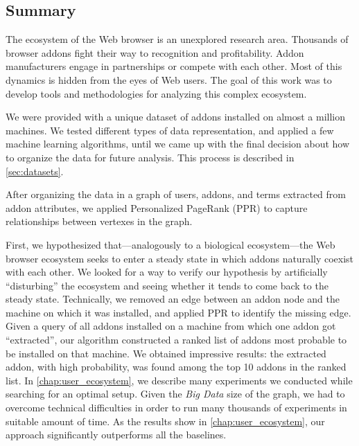 \documentclass[ijoc,nonblindrev]{informs3} %
\numberwithin{equation}{subsection}
\begin{document}
\subsection{Summary}
\label{chap:summary}

The ecosystem of the Web browser is an unexplored research area. Thousands of browser addons fight their way to recognition and profitability. Addon manufacturers engage in partnerships or compete with each other. Most of this dynamics is hidden from the eyes of Web users. The goal of this work was to develop tools and methodologies for analyzing this complex ecosystem.

We were provided with a unique dataset of addons installed on almost a million machines. We tested different types of data representation, and applied a few machine learning algorithms, until we came up with the final decision about how to organize the data for future analysis. This process is described in \autoref{sec:datasets}.

After organizing the data in a graph of users, addons, and terms extracted from addon attributes, we applied Personalized PageRank (PPR) to capture relationships between vertexes in the graph.

First, we hypothesized that---analogously to a biological ecosystem---the Web browser ecosystem seeks to enter a steady state in which addons naturally coexist with each other. We looked for a way to verify our hypothesis by artificially ``disturbing'' the ecosystem and seeing whether it tends to come back to the steady state. Technically, we removed an edge between an addon node and the machine on which it was installed, and applied PPR to identify the missing edge. Given a query of all addons installed on a machine from which one addon got ``extracted'', our algorithm constructed a ranked list of addons most probable to be installed on that machine. We obtained impressive results: the extracted addon, with high probability, was found among the top 10 addons in the ranked list. In \autoref{chap:user_ecosystem}, we describe many experiments we conducted while searching for an optimal setup. Given the \emph{Big Data} size of the graph, we had to overcome technical difficulties in order to run many thousands of experiments in suitable amount of time. As the results show in \autoref{chap:user_ecosystem}, our approach significantly outperforms all the baselines.
\end{document}
